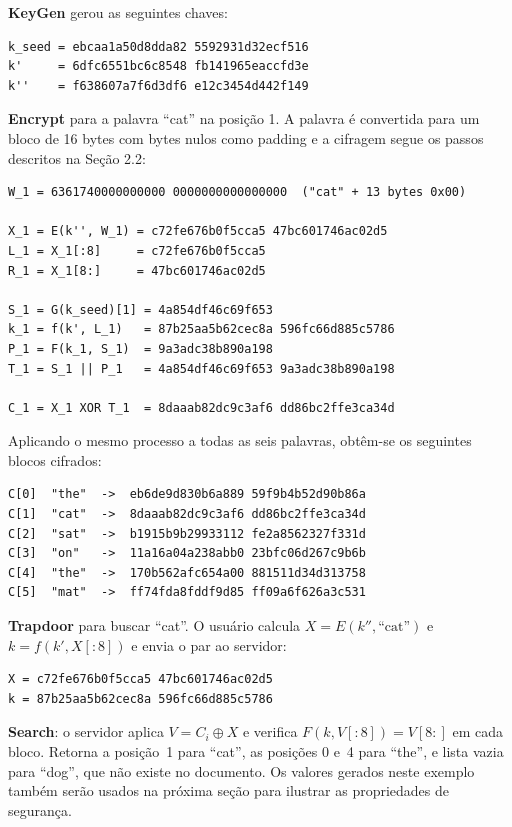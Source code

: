 \documentclass[
  12pt,
  oneside,
  a4paper,
  brazil
]{abntex2}
\begin{document}
\textbf{KeyGen} gerou as seguintes chaves:

\begin{lstlisting}
k_seed = ebcaa1a50d8dda82 5592931d32ecf516
k'     = 6dfc6551bc6c8548 fb141965eaccfd3e
k''    = f638607a7f6d3df6 e12c3454d442f149
\end{lstlisting}

\textbf{Encrypt} para a palavra ``cat'' na posição 1. A palavra é
convertida para um bloco de 16 bytes com bytes nulos como padding e a
cifragem segue os passos descritos na Seção 2.2:

\begin{lstlisting}
W_1 = 6361740000000000 0000000000000000  ("cat" + 13 bytes 0x00)

X_1 = E(k'', W_1) = c72fe676b0f5cca5 47bc601746ac02d5
L_1 = X_1[:8]     = c72fe676b0f5cca5
R_1 = X_1[8:]     = 47bc601746ac02d5

S_1 = G(k_seed)[1] = 4a854df46c69f653
k_1 = f(k', L_1)   = 87b25aa5b62cec8a 596fc66d885c5786
P_1 = F(k_1, S_1)  = 9a3adc38b890a198
T_1 = S_1 || P_1   = 4a854df46c69f653 9a3adc38b890a198

C_1 = X_1 XOR T_1  = 8daaab82dc9c3af6 dd86bc2ffe3ca34d
\end{lstlisting}

Aplicando o mesmo processo a todas as seis palavras, obtêm-se os
seguintes blocos cifrados:

\begin{lstlisting}
C[0]  "the"  ->  eb6de9d830b6a889 59f9b4b52d90b86a
C[1]  "cat"  ->  8daaab82dc9c3af6 dd86bc2ffe3ca34d
C[2]  "sat"  ->  b1915b9b29933112 fe2a8562327f331d
C[3]  "on"   ->  11a16a04a238abb0 23bfc06d267c9b6b
C[4]  "the"  ->  170b562afc654a00 881511d34d313758
C[5]  "mat"  ->  ff74fda8fddf9d85 ff09a6f626a3c531
\end{lstlisting}

\textbf{Trapdoor} para buscar ``cat''. O usuário calcula
$X = E(k'', \text{``cat''})$ e $k = f(k', X[:8])$ e envia o par ao
servidor:

\begin{lstlisting}
X = c72fe676b0f5cca5 47bc601746ac02d5
k = 87b25aa5b62cec8a 596fc66d885c5786
\end{lstlisting}

\textbf{Search}: o servidor aplica $V = C_i \oplus X$ e verifica
$F(k, V[:8]) = V[8:]$ em cada bloco. Retorna a posição~1 para ``cat'',
as posições 0 e~4 para ``the'', e lista vazia para ``dog'', que não
existe no documento. Os valores gerados neste exemplo também serão
usados na próxima seção para ilustrar as propriedades de segurança.
\end{document}
